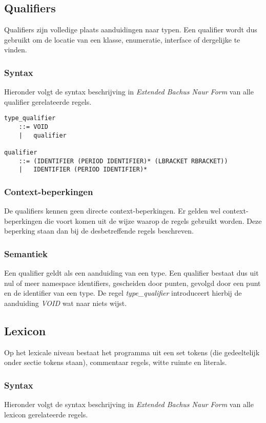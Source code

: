 \subsection{Qualifiers}
Qualifiers zijn volledige plaats aanduidingen naar typen. Een qualifier wordt dus gebruikt om de locatie van een klasse, enumeratie, interface of dergelijke te vinden.

\subsubsection{Syntax}
Hieronder volgt de syntax beschrijving in \textit{Extended Bachus Naur Form} van alle qualifier gerelateerde regels.

\begin{lstlisting}
type_qualifier
	::=	VOID
	|	qualifier

qualifier
	::=	(IDENTIFIER (PERIOD IDENTIFIER)* (LBRACKET RBRACKET))
	|	IDENTIFIER (PERIOD IDENTIFIER)*
\end{lstlisting}

\subsubsection{Context-beperkingen}
De qualifiers kennen geen directe context-beperkingen. Er gelden wel context-beperkingen die voort komen uit de wijze waarop de regels gebruikt worden. Deze beperking staan dan bij de desbetreffende regels beschreven.

\subsubsection{Semantiek}
Een qualifier geldt als een aanduiding van een type. Een qualifier bestaat dus uit nul of meer namespace identifiers, gescheiden door punten, gevolgd door een punt en de identifier van een type. De regel \textit{type\_qualifier} introduceert hierbij de aanduiding \textit{VOID} wat naar niets wijst.

\subsection{Lexicon}
Op het lexicale niveau bestaat het programma uit een set tokens (die gedeeltelijk onder sectie tokens staan), commentaar regels, witte ruimte en literals.

\subsubsection{Syntax}
Hieronder volgt de syntax beschrijving in \textit{Extended Bachus Naur Form} van alle lexicon gerelateerde regels.

